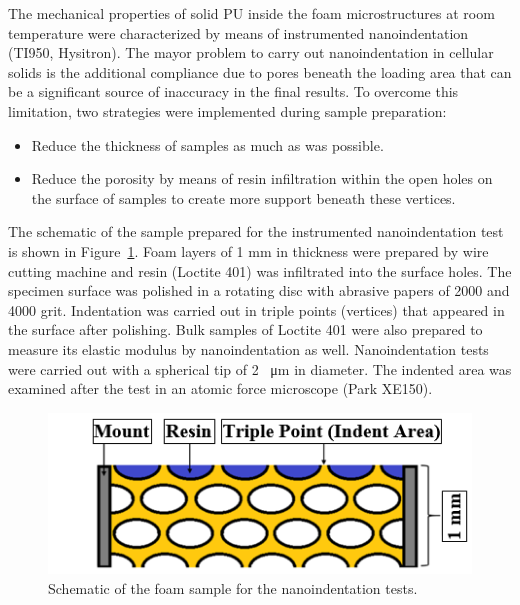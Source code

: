 \documentclass[review]{elsarticle}
\begin{document}
The mechanical properties of solid PU inside the foam microstructures at room temperature were characterized by means of instrumented nanoindentation (TI950, Hysitron). The mayor problem to carry out nanoindentation in cellular solids is the additional compliance due to pores beneath the loading area that can be a significant source of inaccuracy in the final results. To overcome this limitation, two strategies were implemented during sample preparation:
\begin{itemize}
\item Reduce the thickness of samples as much as was possible.
\item Reduce the porosity by means of resin infiltration within the open holes on the surface of samples to create more support beneath these vertices.  
\end{itemize}
 
The schematic of the sample prepared for the instrumented nanoindentation test is shown in Figure~\ref{fig:NanoindentSample}. Foam layers of 1 mm in thickness were prepared by wire cutting machine and resin (Loctite 401) was infiltrated into the surface holes. The specimen surface was polished in a rotating disc with abrasive papers of 2000 and 4000 grit. Indentation was carried out in triple points (vertices) that appeared in the surface after polishing. Bulk samples of Loctite 401 were also prepared to measure its elastic modulus by nanoindentation as well. 
Nanoindentation tests were carried out with a spherical tip of 2 \SI{}{\micro\metre} in diameter. The indented area was examined after the test in an atomic force microscope (Park XE150).
\begin{figure}[hb]
  \centering
  \includegraphics[scale=0.8]{NanoindentSample}
  \captionsetup{justification=centering}
  \caption[Close up of \textit{Hemidactylus} sp.]
   {Schematic of the foam sample for the nanoindentation tests.}
   \label{fig:NanoindentSample}
\end{figure}
\end{document}
